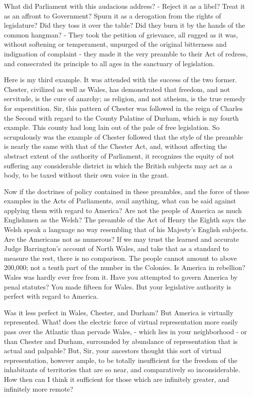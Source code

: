 What did Parliament with this audacious address? - Reject it as a libel? Treat it as an affront to Government? Spurn it as a derogation from the rights of legislature? Did they toss it over the table? Did they burn it by the hands of the common hangman? - They took the petition of grievance, all rugged as it was, without softening or temperament, unpurged of the original bitterness and indignation of complaint - they made it the very preamble to their Act of redress, and consecrated its principle to all ages in the sanctuary of legislation.\par

Here is my third example. It was attended with the success of the two former. Chester, civilized as well as Wales, has demonstrated that freedom, and not servitude, is the cure of anarchy; as religion, and not atheism, is the true remedy for superstition. Sir, this pattern of Chester was followed in the reign of Charles the Second with regard to the County Palatine of Durham, which is my fourth example. This county had long lain out of the pale of free legislation. So scrupulously was the example of Chester followed that the style of the preamble is nearly the same with that of the Chester Act, and, without affecting the abstract extent of the authority of Parliament, it recognizes the equity of not suffering any considerable district in which the British subjects may act as a body, to be taxed without their own voice in the grant.\par

Now if the doctrines of policy contained in these preambles, and the force of these examples in the Acts of Parliaments, avail anything, what can be said against applying them with regard to America? Are not the people of America as much Englishmen as the Welsh? The preamble of the Act of Henry the Eighth says the Welsh speak a language no way resembling that of his Majesty’s English subjects. Are the Americans not as numerous? If we may trust the learned and accurate Judge Barrington’s account of North Wales, and take that as a standard to measure the rest, there is no comparison. The people cannot amount to above 200,000; not a tenth part of the number in the Colonies. Is America in rebellion? Wales was hardly ever free from it. Have you attempted to govern America by penal statutes? You made fifteen for Wales. But your legislative authority is perfect with regard to America.\par

Was it less perfect in Wales, Chester, and Durham? But America is virtually represented. What! does the electric force of virtual representation more easily pass over the Atlantic than pervade Wales, - which lies in your neighborhood - or than Chester and Durham, surrounded by abundance of representation that is actual and palpable? But, Sir, your ancestors thought this sort of virtual representation, however ample, to be totally insufficient for the freedom of the inhabitants of territories that are so near, and comparatively so inconsiderable. How then can I think it sufficient for those which are infinitely greater, and infinitely more remote?\par

